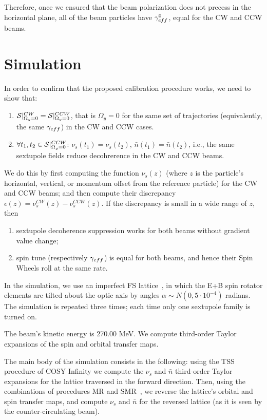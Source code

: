 \documentclass[a4paper]{jacow}
\newcommand{\W}{\Omega}
\newcommand{\nbar}{\bar n}
\begin{document}
Therefore, once we ensured that the beam polarization does not precess in the horizontal plane,
all of the beam particles have $\g*^0$, equal for the CW and CCW beams.

\section{Simulation}
In order to confirm that the proposed calibration procedure works, we need to show that:
\begin{enumerate}
\item $\Stab*^{CW} = \Stab*^{CCW}$, that is $\W_y=0$ for the same set of trajectories (equivalently,
  the same $\g*$) in the CW and CCW cases.
\item $\forall t_1,t_2\in\Stab*^{CCW}$: $\nu_s(t_1) = \nu_s(t_2)$, $\nbar(t_1) = \nbar(t_2)$, i.e., the same
  sextupole fields reduce decohrerence in the CW and CCW beams.
\end{enumerate}

We do this by first computing the function $\nu_s(z)$ (where $z$ is the particle's horizontal, vertical, or
momentum offset from the reference particle) for the CW and CCW beams; and then compute their discrepancy
$\epsilon(z) = \nu_s^{CW}(z) - \nu_s^{CCW}(z)$. If the discrepancy is small in a wide range of $z$, then
\begin{enumerate}
\item sextupole decoherence suppression works for both beams without gradient value change;
\item spin tune (respectively $\g*$) is equal for both beams, and hence their Spin Wheels roll at the
  same rate.
\end{enumerate}

In the simulation, we use an imperfect FS lattice~\cite{Senichev:Lattices}, in which the E+B
spin rotator elements are tilted about the optic axis by angles $\alpha\sim N(0, 5\cdot 10^{-4})$ radians.
The simulation is repeated three times; each time only one sextupole family is turned on.

The beam's kinetic energy is 270.00 MeV. We compute third-order Taylor expansions of the
spin and orbital transfer maps.

The main body of the simulation consists in the following: using the TSS~\cite[p.~41]{COSYINF:BeamPhysMan}
procedure
of COSY Infinity we compute the $\nu_s$ and $\nbar$ third-order Taylor expansions for the lattice traversed
in the forward direction.
Then, using the combinations of procedures MR and SMR~\cite[p.~233]{Eremey:Thesis}, we reverse
the lattice's orbital and spin transfer maps, and compute $\nu_s$ and $\nbar$
for the reversed lattice (as it is seen by the counter-circulating beam).
\end{document}
